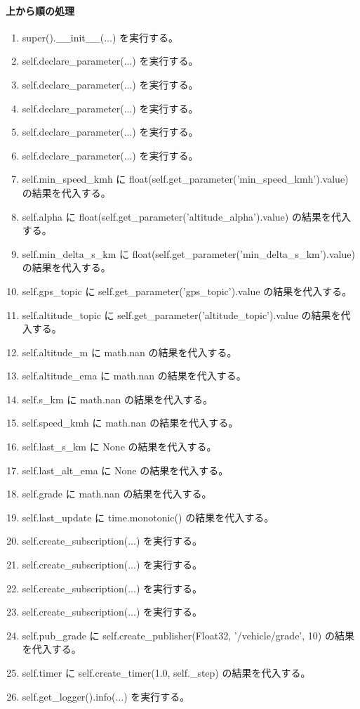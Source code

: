 \documentclass[a4paper,11pt]{article}
\begin{document}
            \paragraph{上から順の処理}
            \begin{enumerate}[leftmargin=1.8em]
            \item super().\_\_init\_\_(...) を実行する。
\item self.declare\_parameter(...) を実行する。
\item self.declare\_parameter(...) を実行する。
\item self.declare\_parameter(...) を実行する。
\item self.declare\_parameter(...) を実行する。
\item self.declare\_parameter(...) を実行する。
\item self.min\_speed\_kmh に float(self.get\_parameter('min\_speed\_kmh').value) の結果を代入する。
\item self.alpha に float(self.get\_parameter('altitude\_alpha').value) の結果を代入する。
\item self.min\_delta\_s\_km に float(self.get\_parameter('min\_delta\_s\_km').value) の結果を代入する。
\item self.gps\_topic に self.get\_parameter('gps\_topic').value の結果を代入する。
\item self.altitude\_topic に self.get\_parameter('altitude\_topic').value の結果を代入する。
\item self.altitude\_m に math.nan の結果を代入する。
\item self.altitude\_ema に math.nan の結果を代入する。
\item self.s\_km に math.nan の結果を代入する。
\item self.speed\_kmh に math.nan の結果を代入する。
\item self.last\_s\_km に None の結果を代入する。
\item self.last\_alt\_ema に None の結果を代入する。
\item self.grade に math.nan の結果を代入する。
\item self.last\_update に time.monotonic() の結果を代入する。
\item self.create\_subscription(...) を実行する。
\item self.create\_subscription(...) を実行する。
\item self.create\_subscription(...) を実行する。
\item self.create\_subscription(...) を実行する。
\item self.pub\_grade に self.create\_publisher(Float32, '/vehicle/grade', 10) の結果を代入する。
\item self.timer に self.create\_timer(1.0, self.\_step) の結果を代入する。
\item self.get\_logger().info(...) を実行する。
            \end{enumerate}
\end{document}

